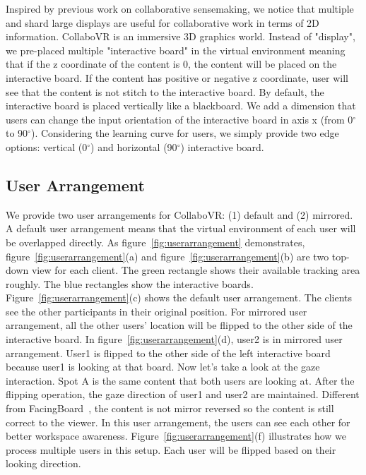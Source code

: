 \documentclass{sigchi}
\begin{document}
Inspired by previous work on collaborative sensemaking, we notice that multiple and shard large displays are useful for collaborative work in terms of 2D information. CollaboVR is an immersive 3D graphics world. Instead of "display", we pre-placed multiple "interactive board" in the virtual environment meaning that if the z coordinate of the content is 0, the content will be placed on the interactive board. If the content has positive or negative z coordinate, user will see that the content is not stitch to the interactive board. By default, the interactive board is placed vertically like a blackboard. We add a dimension that users can change the input orientation of the interactive board in axis x (from 0$^{\circ}$ to 90$^{\circ}$). Considering the learning curve for users, we simply provide two edge options: vertical (0$^{\circ}$) and horizontal (90$^{\circ}$) interactive board.

\subsection{User Arrangement}
We provide two user arrangements for CollaboVR: (1) default and (2) mirrored. A default user arrangement means that the virtual environment of each user will be overlapped directly. As figure~\ref{fig:userarrangement} demonstrates, figure~\ref{fig:userarrangement}(a) and figure~\ref{fig:userarrangement}(b) are two top-down view for each client. The green rectangle shows their available tracking area roughly. The blue rectangles show the interactive boards. Figure~\ref{fig:userarrangement}(c) shows the default user arrangement. The clients see the other participants in their original position. For mirrored user arrangement, all the other users' location will be flipped to the other side of the interactive board. In figure~\ref{fig:userarrangement}(d), user2 is in mirrored user arrangement. User1 is flipped to the other side of the left interactive board because user1 is looking at that board. Now let's take a look at the gaze interaction. Spot A is the same content that both users are looking at. After the flipping operation, the gaze direction of user1 and user2 are maintained. Different from FacingBoard~\cite{li2014interactive}, the content is not mirror reversed so the content is still correct to the viewer. In this user arrangement, the users can see each other for better workspace awareness. Figure~\ref{fig:userarrangement}(f) illustrates how we process multiple users in this setup. Each user will be flipped based on their looking direction.
\end{document}
